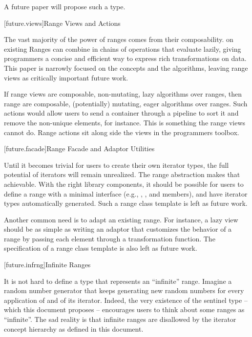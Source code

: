 \pnum
A future paper will propose such a type.

[future.views]{Range Views and Actions}

\pnum
The vast majority of the power of ranges comes from their composability.  on existing
Ranges
can combine in chains of operations that evaluate lazily, giving programmers a concise and efficient
way to express rich transformations on data. This paper is narrowly focused on the concepts and the
algorithms, leaving range views as critically important future work.

\pnum
If range views are composable, non-mutating, lazy algorithms over ranges, then range 
are composable, (potentially) mutating, eager algorithms over ranges. Such actions would allow users
to send a container through a pipeline to sort it and remove the non-unique elements, for instance.
This is something the range views cannot do. Range actions sit along side the views in the
programmers toolbox.

[future.facade]{Range Facade and Adaptor Utilities}

\pnum
Until it becomes trivial for users to create their own iterator types, the full potential of
iterators will remain unrealized. The range abstraction makes that achievable. With the right library
components, it should be possible for users to define a range with a minimal interface
(e.g., , , and  members), and have iterator types
automatically generated. Such a range  class template is left as future work.

\pnum
Another common need is to adapt an existing range. For instance, a lazy  view
should be as simple as writing an adaptor that customizes the behavior of a range by passing each
element through a transformation function. The specification of a range  class
template is also left as future work.

[future.infrng]{Infinite Ranges}

\pnum
It is not hard to define a type that represents an ``infinite'' range. Imagine a random number
generator that keeps generating new random numbers for every application of 
and  of its iterator. Indeed, the very existence of the 
sentinel type -- which this document proposes -- encourages users to think about some ranges as
``infinite''. The sad reality is that infinite ranges are disallowed by the iterator concept
hierarchy as defined in this document.

